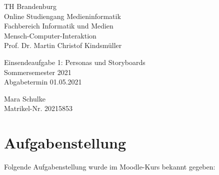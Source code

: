 \documentclass{article}
\begin{document}
\begin{titlepage}
	\begin{flushleft}
		TH Brandenburg \\
		Online Studiengang Medieninformatik \\
		Fachbereich Informatik und Medien \\
		Mensch-Computer-Interaktion \\
		Prof. Dr. Martin Christof Kindsmüller
	\end{flushleft}

	\vfill

	\begin{center}
		\Large{Einsendeaufgabe 1: Personas und Storyboards}\\[0.5em]
		\large{Sommersemester 2021}\\[0.25em]
		\large{Abgabetermin 01.05.2021}
	\end{center}

	\vfill

	\begin{flushright}
		Mara Schulke \\
		Matrikel-Nr. 20215853
	\end{flushright}
\end{titlepage}

\section{Aufgabenstellung}

Folgende Aufgabenstellung wurde im Moodle-Kurs bekannt gegeben:
\end{document}
